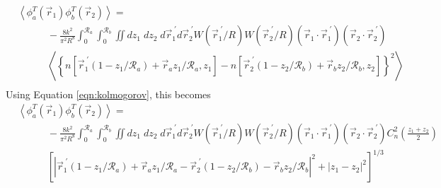 \begin{equation}\label{eqn:tphase_n2}
\begin{aligned}
&\left\langle \phi^{T}_{a}\left(\vec{r}_{1}\right) \phi^{T}_{b}\left(\vec{r}_{2}\right)\right\rangle = \\
&\quad\quad\quad
-\frac{8k^{2}}{\pi^{2}R^{8}} \int_{0}^{\mathcal{R}_{a}}  \int_{0}^{\mathcal{R}_{b}} \iint dz_{1} \; dz_{2} \; d\vec{r}^{\;\prime}_{1}d\vec{r}^{\;\prime}_{2} W(\vec{r}^{\;\prime}_{1}/R) W(\vec{r}^{\;\prime}_{2}/R)
\left(\vec{r}_{1} \cdot \vec{r}^{\;\prime}_{1}\right)
\left(\vec{r}_{2} \cdot \vec{r}^{\;\prime}_{2}\right)
\\
&\quad\quad\quad
\left\langle \left\{ n\left[\vec{r}^{\;\prime}_{1}\left(1-z_{1}/\mathcal{R}_{a}\right) + \vec{r}_{a} z_{1}/\mathcal{R}_{a}, z_{1}\right] - 
 n\left[\vec{r}^{\;\prime}_{2}\left(1-z_{2}/\mathcal{R}_{b}\right) + \vec{r}_{b} z_{2}/\mathcal{R}_{b}, z_{2}\right]\right\}^{2} \right\rangle \\
\end{aligned}
\end{equation}
Using Equation \ref{eqn:kolmogorov}, this becomes
\begin{equation}\label{eqn:tphase_n3}
\begin{aligned}
&\left\langle \phi^{T}_{a}\left(\vec{r}_{1}\right) \phi^{T}_{b}\left(\vec{r}_{2}\right)\right\rangle = \\
&\quad\quad\quad
-\frac{8k^{2}}{\pi^{2}R^{8}} \int_{0}^{\mathcal{R}_{a}}  \int_{0}^{\mathcal{R}_{b}} \iint dz_{1} \; dz_{2} \; d\vec{r}^{\;\prime}_{1}d\vec{r}^{\;\prime}_{2} W(\vec{r}^{\;\prime}_{1}/R) W(\vec{r}^{\;\prime}_{2}/R)
\left(\vec{r}_{1} \cdot \vec{r}^{\;\prime}_{1}\right)
\left(\vec{r}_{2} \cdot \vec{r}^{\;\prime}_{2}\right)
C_{n}^{2}\left(\frac{z_{1} + z_{2}}{2}\right) 
\\
&\quad\quad\quad
\left[ \left\vert \vec{r}^{\;\prime}_{1}\left(1-z_{1}/\mathcal{R}_{a}\right) + \vec{r}_{a} z_{1}/\mathcal{R}_{a} - 
 \vec{r}^{\;\prime}_{2}\left(1-z_{2}/\mathcal{R}_{b}\right) - \vec{r}_{b} z_{2}/\mathcal{R}_{b}\right\vert^{2} + 
\left\vert z_{1} - z_{2} \right\vert^{2} \right]^{1/3}
\end{aligned}
\end{equation}

